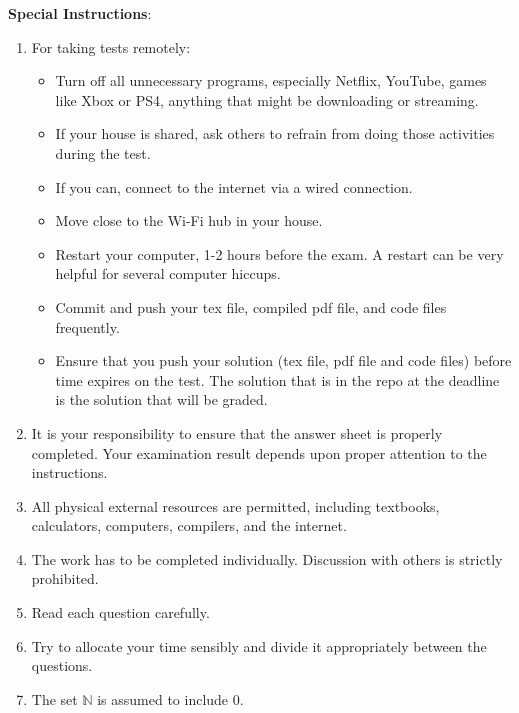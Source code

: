 \documentclass[12pt,fleqn]{examtst}
\begin{document}
\noindent
\textbf{Special Instructions}:

\begin{enumerate}

\item For taking tests remotely: 
\begin{itemize}
\item Turn off all unnecessary programs, especially Netflix, YouTube, games like
  Xbox or PS4, anything that might be downloading or streaming.
\item If your house is shared, ask others to refrain from doing those activities
  during the test.
\item If you can, connect to the internet via a wired connection.
\item Move close to the Wi-Fi hub in your house. 
\item Restart your computer, 1-2 hours before the exam. A restart can be very
  helpful for several computer hiccups.
\item Commit and push your tex file, compiled pdf file, and code files
  frequently.
\item Ensure that you push your solution (tex file, pdf file and code files)
  before time expires on the test.  The solution that is in the repo at the
  deadline is the solution that will be graded.
\end{itemize}
\item It is your responsibility to ensure that the answer sheet is properly
  completed. Your examination result depends upon proper attention to the
  instructions.
\item All physical external resources are permitted, including textbooks, calculators,
  computers, compilers, and the internet.
\item The work has to be completed individually.  Discussion with others is
  strictly prohibited.
\item Read each question carefully.
\item Try to allocate your time sensibly and divide it appropriately between the
  questions.
\item The set $\mathbb{N}$ is assumed to include $0$.
\end{enumerate}


\renewcommand{\labelenumi}{\Alph{enumi}.}
\end{document}

